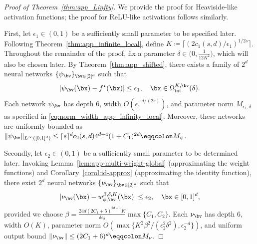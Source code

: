 \documentclass[11pt]{article}
\begin{document}
\begin{proof}[Proof of Theorem~\ref{thm:app_Linfty}]
    We provide the proof for Heaviside-like activation functions; the proof for ReLU-like activations follows similarly. 

    First, let $\epsilon_1\in(0,1)$ be a sufficiently small parameter to be specified later. Following Theorem~\ref{thm:app_infinite_local}, define $K \coloneqq \lceil (2 c_1(s,d) /\epsilon_1)^{1/2s} \rceil$. Throughout the remainder of the proof, fix a parameter $\delta\in\bigl(0,\frac{1}{12K^2}\bigr)$, which will also be chosen later. By Theorem~\ref{thm:app_shifted}, there exists a family of $2^d$ neural networks $\{\psi_{\bv}\}_{\bv \in[2]^d}$ such that
    \begin{equation}
        |\psi_{\bv}(\bx) - f^{\star}(\bx)| \leq \epsilon_1, \quad \bx \in \Omega_{\mathrm{int}}^{K, \bv}(\delta).
        \label{eq:app-psiv-fstar}
    \end{equation}
    Each network $\psi_{\bv}$ has depth $6$, width $O(\epsilon_1^{-d/(2s)})$, and parameter norm $M_{\epsilon_1, \delta}$ as specified in \eqref{eq:norm_width_app_infinity_local}. Moreover, these networks are uniformly bounded as $\|\psi_{\bv}\|_{L^{\infty}([0,1]^d)} \leq \lceil s\rceil^dc_2(s,d) 4^{d+4}(1+C_1)^{2d}\eqqcolon M_{\psi}$. 
    

     Secondly, let $\epsilon_2 \in (0,1)$ be a sufficiently small parameter to be determined later. Invoking Lemma~\ref{lem:app-multi-weight-global} (approximating the weight functions) and Corollary~\ref{corol:id-approx} (approximating the identity function), there exist $2^d$ neural networks $\{\nu_{\bv}\}_{\bv \in [2]^d}$ such that
     \begin{equation}
        |\nu_{\bv}(\bx) - w_{\phi, \bv}^{\beta, \delta,K}(\bx)| \leq \epsilon_2, \quad  \bx \in [0,1]^d,
        \label{eq:app-nuv-w}
    \end{equation}
    provided we choose $\beta = \frac{24d(2C_1+5)^{2d+1} K}{\delta \epsilon_2 } \max\{ C_1, C_2\}$. Each $\nu_{\bv}$ has depth $6$, width $O(K)$, parameter norm $O(\max \{ K^2 \beta^2/(\epsilon_2^2 \delta^2), \epsilon_2^{-d}\})$, and uniform output bound $\|\nu_{\bv} \| \leq (2C_1+6)^d \eqqcolon M_{\nu}$.


\end{proof}
\end{document}
